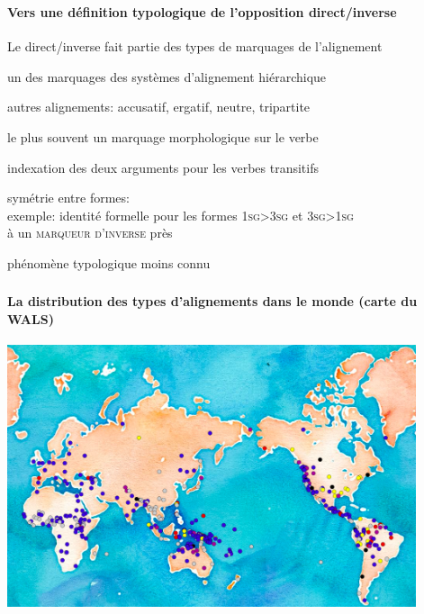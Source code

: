 \begin{frame}
\frametitle{}
\framesubtitle{Vers une définition typologique de l'opposition direct/inverse}
\begin{wideitemize}
\item Le direct/inverse fait partie des types de marquages de
  l'alignement
\begin{smallwideitemize}
\item un des marquages des systèmes d'alignement hiérarchique
\item autres alignements: accusatif, ergatif, neutre, tripartite
\pause
\item le plus souvent un marquage morphologique sur le verbe
\item indexation des deux arguments pour les verbes transitifs
\item symétrie entre formes:\\ exemple: identité formelle pour les formes \textsc{1sg>3sg} et
  \textsc{3sg>1sg}\\ à un \textsc{marqueur d'inverse} près
\pause
\item phénomène typologique moins connu
\item \cite{zuniga06}
\end{smallwideitemize}
\end{wideitemize}
\end{frame}


\begin{frame}
\frametitle{}
\framesubtitle{La distribution des types d'alignements 
  dans le monde (carte du WALS)}
\begin{center}
\vspace*{-.3cm}
\includegraphics[width=120mm]{hierarchy}

\end{center}
\end{frame}


